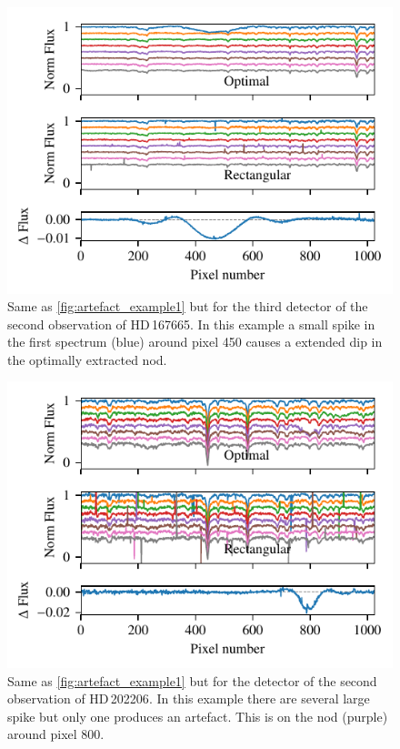  \begin{figure}
     \centering
     \includegraphics[width=0.7\linewidth]{figures/appendix/bp_plots/extraction_comparision_HD167665-1b_chip_3}
     \caption{Same as \cref{fig:artefact_example1} but for the third detector of the second observation of {HD\,167665}.
In this example a small spike in the first spectrum (blue) around pixel 450 causes a extended dip in the optimally extracted nod.}
     \label{fig:artefact_example3}
 \end{figure}
 \begin{figure}
    \centering
    \includegraphics[width=0.7\linewidth]{figures/appendix/bp_plots/extraction_comparision_HD202206-2_chip_1}
    \caption{Same as \cref{fig:artefact_example1} but for the  detector of the second observation of {HD\,202206}.
In this example there are several large spike but only one produces an artefact.
This is on the  nod (purple) around pixel 800.}
    \label{fig:artefact_example4}
\end{figure}
